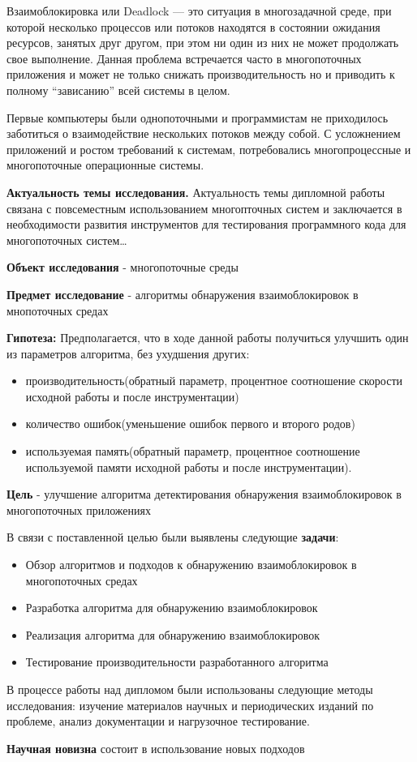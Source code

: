 
Взаимоблокировка или Deadlock \cite{Deadlock} — это ситуация в многозадачной среде, при которой несколько процессов или потоков находятся в состоянии ожидания ресурсов, занятых друг другом, при этом ни один из них не может продолжать свое выполнение. Данная проблема встречается часто в многопоточных приложения и может не только снижать производительность но и приводить к полному “зависанию” всей системы в целом.

Первые компьютеры были однопоточными и программистам не приходилось заботиться о взаимодействие нескольких потоков между собой. С усложнением приложений и ростом требований к системам, потребовались многопроцессные и многопоточные операционные системы.

\textbf{Актуальность темы исследования.} Актуальность темы дипломной работы связана с повсеместным использованием многопточных систем и заключается в необходимости развития инструментов для тестирования программного кода для многопоточных систем\dots

\textbf{Объект исследования} - многопоточные среды

\textbf{Предмет исследование} - алгоритмы обнаружения взаимоблокировок в мнопоточных средах

\textbf{Гипотеза:} Предполагается, что в ходе данной работы получиться улучшить один из параметров алгоритма, без ухудшения других:
\begin{itemize} 
\item  производительность(обратный параметр, процентное соотношение скорости исходной работы и после инструментации)
\item количество ошибок(уменьшение ошибок первого и второго родов)
\item используемая память(обратный параметр, процентное соотношение используемой памяти исходной работы и после инструментации).
\end{itemize} 

\textbf{Цель} - улучшение алгоритма детектирования обнаружения взаимоблокировок в многопоточных приложениях

В связи с поставленной целью были выявлены следующие \textbf{задачи}:

\begin{itemize}  
\item Обзор алгоритмов и подходов к обнаружению взаимоблокировок в многопоточных средах
\item Разработка алгоритма для обнаружению взаимоблокировок
\item Реализация алгоритма для обнаружению взаимоблокировок
\item Тестирование производительности разработанного алгоритма
\end{itemize}

В процессе работы над дипломом были использованы следующие методы исследования: изучение материалов научных и периодических изданий по проблеме, анализ документации и нагрузочное тестирование.

\textbf{Научная новизна} состоит в использование новых подходов 

\clearpage